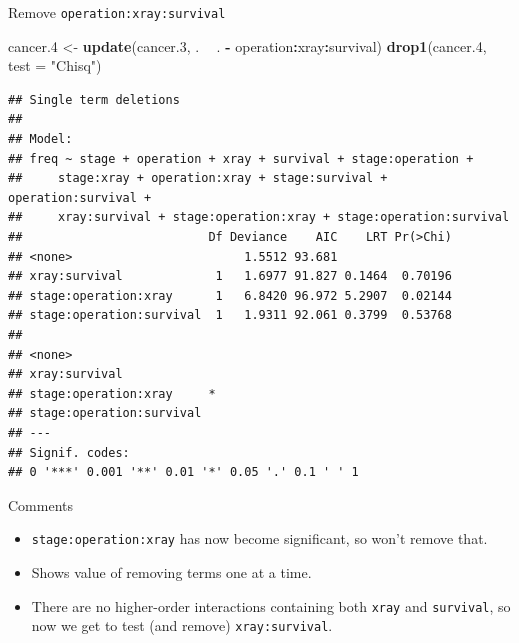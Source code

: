 \documentclass[ignorenonframetext,]{beamer}
\newenvironment{Shaded}{\begin{snugshade}}{\end{snugshade}}
\newcommand{\DataTypeTok}[1]{\textcolor[rgb]{0.13,0.29,0.53}{#1}}
\newcommand{\FloatTok}[1]{\textcolor[rgb]{0.00,0.00,0.81}{#1}}
\newcommand{\KeywordTok}[1]{\textcolor[rgb]{0.13,0.29,0.53}{\textbf{#1}}}
\newcommand{\NormalTok}[1]{#1}
\newcommand{\OperatorTok}[1]{\textcolor[rgb]{0.81,0.36,0.00}{\textbf{#1}}}
\newcommand{\StringTok}[1]{\textcolor[rgb]{0.31,0.60,0.02}{#1}}
\begin{document}
\begin{frame}[fragile]{Remove \texttt{operation:xray:survival}}
\protect\hypertarget{remove-operationxraysurvival}{}

\begin{Shaded}
\begin{Highlighting}[]
\NormalTok{cancer}\FloatTok{.4}\NormalTok{ <-}\StringTok{ }\KeywordTok{update}\NormalTok{(cancer}\FloatTok{.3}\NormalTok{, . }\OperatorTok{~}\StringTok{ }\NormalTok{. }\OperatorTok{-}\StringTok{ }\NormalTok{operation}\OperatorTok{:}\NormalTok{xray}\OperatorTok{:}\NormalTok{survival)}
\KeywordTok{drop1}\NormalTok{(cancer}\FloatTok{.4}\NormalTok{, }\DataTypeTok{test =} \StringTok{"Chisq"}\NormalTok{)}
\end{Highlighting}
\end{Shaded}

\begin{verbatim}
## Single term deletions
## 
## Model:
## freq ~ stage + operation + xray + survival + stage:operation + 
##     stage:xray + operation:xray + stage:survival + operation:survival + 
##     xray:survival + stage:operation:xray + stage:operation:survival
##                          Df Deviance    AIC    LRT Pr(>Chi)
## <none>                        1.5512 93.681                
## xray:survival             1   1.6977 91.827 0.1464  0.70196
## stage:operation:xray      1   6.8420 96.972 5.2907  0.02144
## stage:operation:survival  1   1.9311 92.061 0.3799  0.53768
##                           
## <none>                    
## xray:survival             
## stage:operation:xray     *
## stage:operation:survival  
## ---
## Signif. codes:  
## 0 '***' 0.001 '**' 0.01 '*' 0.05 '.' 0.1 ' ' 1
\end{verbatim}

\end{frame}

\begin{frame}[fragile]{Comments}
\protect\hypertarget{comments-34}{}

\begin{itemize}
\item
  \texttt{stage:operation:xray} has now become significant, so won't
  remove that.
\item
  Shows value of removing terms one at a time.
\item
  There are no higher-order interactions containing both \texttt{xray}
  and \texttt{survival}, so now we get to test (and remove)
  \texttt{xray:survival}.
\end{itemize}

\end{frame}
\end{document}
